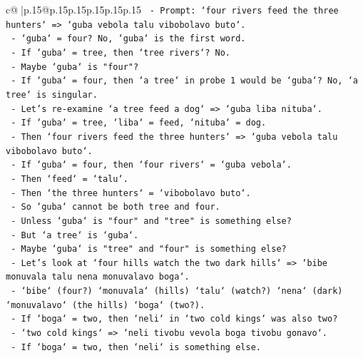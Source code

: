 \documentclass{article}
\begin{document}
{\begin{supertabular}{c@{$\;$}|p{.15\linewidth}@{}p{.15\linewidth}p{.15\linewidth}p{.15\linewidth}p{.15\linewidth}p{.15\linewidth}}
{{{\texttt{                 {-} Prompt: `four rivers feed the three hunters` => `guba vebola talu vibobolavo buto`.} \\
\texttt{                   {-} `guba` = four? No, `guba` is the first word.} \\
\texttt{                   {-} If `guba` = tree, then `tree rivers`? No.} \\
\texttt{                   {-} Maybe `guba` is "four"?} \\
\texttt{                   {-} If `guba` = four, then `a tree` in probe 1 would be `guba`? No, `a tree` is singular.} \\
\texttt{                   {-} Let's re{-}examine `a tree feed a dog` => `guba liba nituba`.} \\
\texttt{                   {-} If `guba` = tree, `liba` = feed, `nituba` = dog.} \\
\texttt{                   {-} Then `four rivers feed the three hunters` => `guba vebola talu vibobolavo buto`.} \\
\texttt{                   {-} If `guba` = four, then `four rivers` = `guba vebola`.} \\
\texttt{                   {-} Then `feed` = `talu`.} \\
\texttt{                   {-} Then `the three hunters` = `vibobolavo buto`.} \\
\texttt{                   {-} So `guba` cannot be both tree and four.} \\
\texttt{                   {-} Unless `guba` is "four" and "tree" is something else?} \\
\texttt{                   {-} But `a tree` is `guba`.} \\
\texttt{                   {-} Maybe `guba` is "tree" and "four" is something else?} \\
\texttt{                   {-} Let's look at `four hills watch the two dark hills` => `bibe monuvala talu nena monuvalavo boga`.} \\
\texttt{                     {-} `bibe` (four?) `monuvala` (hills) `talu` (watch?) `nena` (dark) `monuvalavo` (the hills) `boga` (two?).} \\
\texttt{                     {-} If `boga` = two, then `neli` in `two cold kings` was also two?} \\
\texttt{                     {-} `two cold kings` => `neli tivobu vevola boga tivobu gonavo`.} \\
\texttt{                     {-} If `boga` = two, then `neli` is something else.} \\
}}}
\end{supertabular}}
\end{document}
